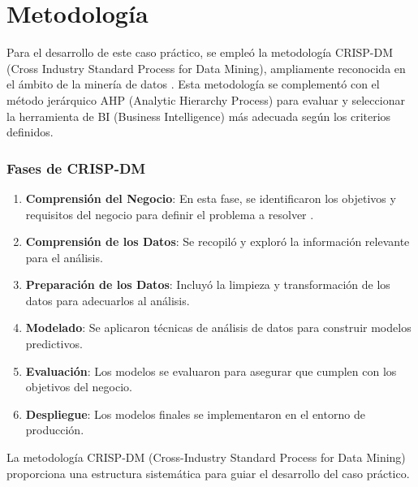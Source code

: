 \documentclass[
  11pt,
  bookmarksnumbered]{article}
\begin{document}
\newpage

\hypertarget{metodologuxeda}{%
\section{\texorpdfstring{\textbf{Metodología}}{Metodología}}\label{metodologuxeda}}

Para el desarrollo de este caso práctico, se empleó la metodología CRISP-DM (Cross Industry Standard Process for Data Mining), ampliamente reconocida en el ámbito de la minería de datos \textcite{shearer2000crispdm}.
Esta metodología se complementó con el método jerárquico AHP (Analytic Hierarchy Process) para evaluar y seleccionar la herramienta de BI (Business Intelligence) más adecuada según los criterios definidos.

\hypertarget{fases-de-crisp-dm}{%
\subsubsection{Fases de CRISP-DM}\label{fases-de-crisp-dm}}

\begin{enumerate}
\def\labelenumi{\arabic{enumi}.}
\item
  \textbf{Comprensión del Negocio}: En esta fase, se identificaron los objetivos y requisitos del negocio para definir el problema a resolver \textcite{wirth2000crispdm}.
\item
  \textbf{Comprensión de los Datos}: Se recopiló y exploró la información relevante para el análisis.
\item
  \textbf{Preparación de los Datos}: Incluyó la limpieza y transformación de los datos para adecuarlos al análisis.
\item
  \textbf{Modelado}: Se aplicaron técnicas de análisis de datos para construir modelos predictivos.
\item
  \textbf{Evaluación}: Los modelos se evaluaron para asegurar que cumplen con los objetivos del negocio.
\item
  \textbf{Despliegue}: Los modelos finales se implementaron en el entorno de producción.
\end{enumerate}

La metodología CRISP-DM (Cross-Industry Standard Process for Data Mining) proporciona una estructura sistemática para guiar el desarrollo del caso práctico.
\end{document}
